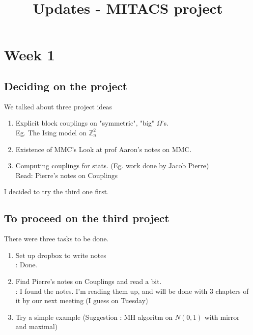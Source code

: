 \documentclass{article}
\title{Updates - MITACS project
}
\begin{document}
\maketitle
\section{Week 1}
	\subsection{Deciding on the project}
		We talked about three project ideas
		\begin{enumerate}
			\item Explicit block couplings on "symmetric", "big" $\Omega$'s.\\
				Eg. The Ising model on $\mathbb{Z}^2_n$
			\item Existence of MMC's
				Look at prof Aaron's notes on MMC.
			\item Computing couplings for stats. (Eg. work done by Jacob Pierre)\\
				Read: Pierre's notes on Couplings
		\end{enumerate}
		I decided to try the third one first.

	\subsection{To proceed on the third project}
		There were three tasks to be done.
		\begin{enumerate}
			\item Set up dropbox to write notes\\
				\Update: Done.
			\item Find Pierre's notes on Couplings and read a bit.\\
				\Update: I found the notes. I'm reading them up, and will be done with 3 chapters of it by our next meeting (I guess on Tuesday)
   			\item Try a simple example (Suggestion : MH algoritm on $N(0, 1)$ with mirror and maximal)\\

		\end{enumerate}
\end{document}
